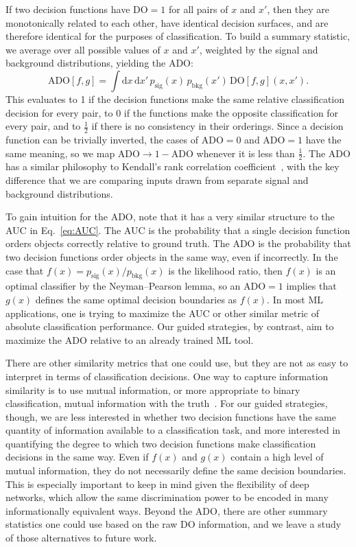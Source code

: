 \documentclass[aps,prd,twocolumn,superscriptaddress,preprintnumbers,nofootinbib,longbibliography,floatfix]{revtex4-1}
\newcommand{\DO}{\text{DO}}
\newcommand{\ADO}{\text{ADO}}
\newcommand{\Eq}[1]{Eq.~\eqref{#1}}
\begin{document}
If two decision functions have $\DO = 1$ for all pairs of $x$ and $x'$, then they are monotonically related to each other, have identical decision surfaces, and are therefore identical for the purposes of classification. To build a summary statistic, we average over all possible values of $x$ and $x'$, weighted by the signal and background distributions, yielding the ADO:
\begin{equation}
	\label{eq:ADO}
	\ADO[f,g]  = \int \mathrm{d}x\, \mathrm{d}x'\, p_{\text{sig}}(x) \, p_{\text{bkg}} (x') \, \textrm{DO}[f,g](x,x').
\end{equation}
This evaluates to 1 if the decision functions make the same relative classification decision for every pair, to 0 if the functions make the opposite classification for every pair, and to $\frac{1}{2}$ if there is no consistency in their orderings. Since a decision function can be trivially inverted, the cases of $\ADO=0$ and $\ADO=1$ have the same meaning, so we map $\ADO \rightarrow 1- \ADO$ whenever it is less than $\frac{1}{2}$. The ADO has a similar philosophy to Kendall's rank correlation coefficient~\cite{ktau}, with the key difference that we are comparing inputs drawn from separate signal and background distributions.

To gain intuition for the ADO, note that it has a very similar structure to the AUC in \Eq{eq:AUC}. The AUC is the probability that a single decision function orders objects correctly relative to ground truth. The ADO is the probability that two decision functions order objects in the same way, even if incorrectly. In the case that $f(x) = p_{\text{sig}}(x) / p_{\text{bkg}}(x)$ is the likelihood ratio, then $f(x)$ is an optimal classifier by the Neyman--Pearson lemma, so an $\ADO = 1$ implies that $g(x)$ defines the same optimal decision boundaries as $f(x)$. In most ML applications, one is trying to maximize the AUC or other similar metric of absolute classification performance. Our guided strategies, by contrast, aim to maximize the ADO relative to an already trained ML tool.

There are other similarity metrics that one could use, but they are not as easy to interpret in terms of classification decisions. One way to capture information similarity is to use mutual information, or more appropriate to binary classification, mutual information with the truth~\cite{Larkoski:2014pca}. For our guided strategies, though, we are less interested in whether two decision functions have the same quantity of information available to a classification task, and more interested in quantifying the degree to which two decision functions make classification decisions in the same way. Even if $f(x)$ and $g(x)$ contain a high level of mutual information, they do not necessarily define the same decision boundaries. This is especially important to keep in mind given the flexibility of deep networks, which allow the same discrimination power to be encoded in many informationally equivalent ways. Beyond the ADO, there are other summary statistics one could use based on the raw DO information, and we leave a study of those alternatives to future work.
\end{document}

